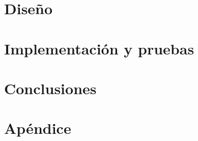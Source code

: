 \documentclass[twoside,spanish,a4paper,12pt]{tfg}
\begin{document}
\chapter{Diseño}


\chapter{Implementación y pruebas}

\chapter{Conclusiones}




\pagestyle{appendix}

\appendix
\chapter{Apéndice}




\end{document}
